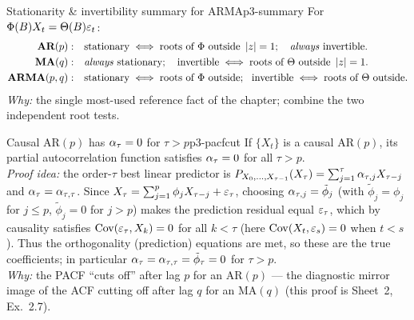 \begin{corollary}{Stationarity \& invertibility summary for ARMA}{p3-summary}
For $\Phi(B)X_t=\Theta(B)\varepsilon_t$:
\[
\begin{aligned}
\textbf{AR}(p):&\quad \text{stationary}\iff \text{roots of }\Phi\ \text{outside }\abs{z}=1;\quad \text{\emph{always} invertible.}\\
\textbf{MA}(q):&\quad \text{\emph{always} stationary};\quad \text{invertible}\iff \text{roots of }\Theta\ \text{outside }\abs{z}=1.\\
\textbf{ARMA}(p,q):&\quad \text{stationary}\iff \text{roots of }\Phi\ \text{outside};\ \ \text{invertible}\iff \text{roots of }\Theta\ \text{outside.}
\end{aligned}
\]
\textit{Why:} the single most-used reference fact of the chapter; combine the
two independent root tests.
\end{corollary}

\begin{proposition}{Causal $\mathrm{AR}(p)$ has $\alpha_\tau=0$ for $\tau>p$}{p3-pacfcut}
If $\{X_t\}$ is a causal $\mathrm{AR}(p)$, its partial autocorrelation function
satisfies $\alpha_\tau=0$ for all $\tau>p$.\\
\textit{Proof idea:} the order-$\tau$ best linear predictor is
$P_{X_0,\dots,X_{\tau-1}}(X_\tau)=\sum_{j=1}^{\tau}\alpha_{\tau,j}X_{\tau-j}$ and
$\alpha_\tau=\alpha_{\tau,\tau}$. Since
$X_\tau=\sum_{j=1}^p\phi_j X_{\tau-j}+\varepsilon_\tau$, choosing
$\alpha_{\tau,j}=\tilde\phi_j$ (with $\tilde\phi_j=\phi_j$ for $j\le p$,
$\tilde\phi_j=0$ for $j>p$) makes the prediction residual equal $\varepsilon_\tau$,
which by causality satisfies $\operatorname{Cov}(\varepsilon_\tau,X_k)=0$ for all $k<\tau$ (here
$\operatorname{Cov}(X_t,\varepsilon_s)=0$ when $t<s$). Thus the orthogonality (prediction) equations
are met, so these are the true coefficients; in particular
$\alpha_\tau=\alpha_{\tau,\tau}=\tilde\phi_\tau=0$ for $\tau>p$.\\
\textit{Why:} the PACF ``cuts off'' after lag $p$ for an $\mathrm{AR}(p)$ ---
the diagnostic mirror image of the ACF cutting off after lag $q$ for an
$\mathrm{MA}(q)$ (this proof is Sheet~2, Ex.~2.7).
\end{proposition}

